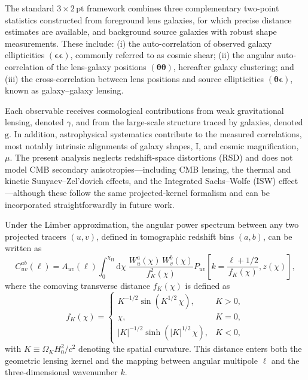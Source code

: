 The standard \(3\times2\,\mathrm{pt}\) framework combines three complementary two-point statistics constructed from foreground lens galaxies, for which precise distance estimates are available, and background source galaxies with robust shape measurements. These include: (i) the auto-correlation of observed galaxy ellipticities \((\boldsymbol{\epsilon\epsilon})\), commonly referred to as cosmic shear; (ii) the angular auto-correlation of the lens-galaxy positions \((\boldsymbol{\theta\theta})\), hereafter galaxy clustering; and (iii) the cross-correlation between lens positions and source ellipticities \((\boldsymbol{\theta\epsilon})\), known as galaxy--galaxy lensing.

Each observable receives cosmological contributions from weak gravitational lensing, denoted \(\gamma\), and from the large-scale structure traced by galaxies, denoted \(\mathrm{g}\). In addition, astrophysical systematics contribute to the measured correlations, most notably intrinsic alignments of galaxy shapes, \(\mathrm{I}\), and cosmic magnification, \(\mu\). The present analysis neglects redshift-space distortions (RSD) and does not model CMB secondary anisotropies---including CMB lensing, the thermal and kinetic Sunyaev--Zel'dovich effects, and the Integrated Sachs--Wolfe (ISW) effect---although these follow the same projected-kernel formalism and can be incorporated straightforwardly in future work.

Under the Limber approximation, the angular power spectrum between any two projected tracers \((u, v)\), defined in tomographic redshift bins \((a, b)\), can be written as
\begin{equation} \label{eq:2.1}
    C_{uv}^{ab} (\ell) = A_{uv} (\ell) \int_{0}^{\chi_{\mathrm H}} \mathrm{d}\chi \; \frac{W_u^{a}(\chi) \, W_v^{b}(\chi)}{f_K^{2}(\chi)} P_{uv} \! \left[k = \frac{\ell + 1/2}{f_K(\chi)}, z(\chi)\right],
\end{equation}
where the comoving transverse distance \(f_K(\chi)\) is defined as
\begin{equation} \label{eq:2.2}
    f_K(\chi) =
    \begin{cases}
        K^{-1/2}
        \sin \! \left(K^{1/2} \, \chi\right), & K > 0,
        \\[6pt] \chi, & K = 0,
        \\[6pt] |K|^{-1/2} \sinh \! \left(|K|^{1/2} \, \chi\right), & K < 0,
    \end{cases}
\end{equation}
with \(K \equiv \Omega_K H_0^2 / c^2\) denoting the spatial curvature. This distance enters both the geometric lensing kernel and the mapping between angular multipole \(\ell\) and the three-dimensional wavenumber \(k\).


